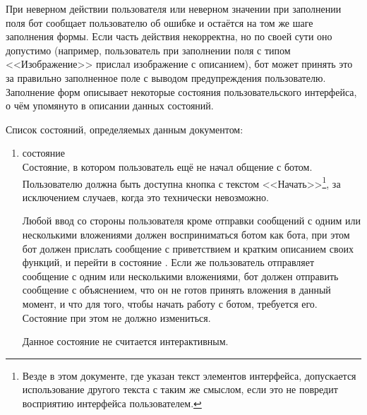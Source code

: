    При неверном действии пользователя или неверном значении при заполнении поля бот сообщает пользователю
    об ошибке и остаётся на том же шаге заполнения формы. Если часть действия некорректна, но по своей сути
    оно допустимо (например, пользователь при заполнении поля с типом <<Изображение>> прислал изображение с
    описанием), бот может принять это за правильно заполненное поле с выводом предупреждения пользователю.
    Заполнение форм описывает некоторые состояния пользовательского интерфейса, о чём упомянуто в описании
    данных состояний.

    Список состояний, определяемых данным документом:
    \begin{enumerate}
        \item \label{itm:req:ui:states:init}
             состояние \\
            Состояние, в котором пользователь ещё не начал общение с ботом.
            Пользователю должна быть доступна кнопка с текстом <<Начать>>\footnote{
            Везде в этом документе, где указан текст элементов интерфейса, допускается
            использование другого текста с таким же смыслом, если это не повредит восприятию
            интерфейса пользователем.}, за исключением случаев, когда это технически невозможно.

            Любой ввод со стороны пользователя кроме отправки сообщений с одним или несколькими
            вложениями должен восприниматься ботом как  бота, при этом бот должен прислать
            сообщение с приветствием и кратким описанием своих функций, и перейти в состояние
            \hyperref[itm:req:ui:states:mainmenu]{}.
            Если же пользователь отправляет сообщение с одним или несколькими
            вложениями, бот должен отправить сообщение с объяснением, что он не готов принять вложения
            в данный момент, и что для того, чтобы начать работу с ботом, требуется 
            его. Состояние при этом не должно измениться.

            Данное состояние не считается интерактивным.


\end{enumerate}
